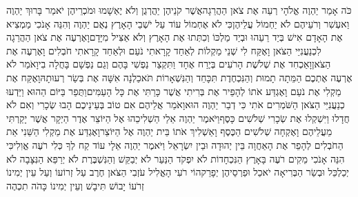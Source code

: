 \documentclass[../main/main.tex]{subfiles}
\begin{document}
\begin{multicols}{\ncols}
כֹּה אָמַר יַהְוֶה אֱלֹהָי רְעֵה אֶת צֹאן הַהֲרֵגָה\PreVerseSpace{}אֲשֶׁר קֹנֵיהֶן יַהֲרְגֻן וְלֹא יֶאְשָׁמוּ וּמֹכְרֵיהֶן יֹאמַר בָּרוּךְ יַהְוֶה וַאעְשִׁר וְרֹעֵיהֶם לֹא יַחְמוֹל עֲלֵיהֶן\PreVerseSpace{}כִּי לֹא אֶחְמוֹל עוֹד עַל יֹשְׁבֵי הָאָרֶץ נְאֻם יַהְוֶה וְהִנֵּה אָנֹכִי מַמְצִיא אֶת הָאָדָם אִישׁ בְּיַד רֵעֵהוּ וּבְיַד מַלְכּוֹ וְכִתְּתוּ אֶת הָאָרֶץ וְלֹא אַצִּיל מִיָּדָם\PreVerseSpace{}וָאֶרְעֶה אֶת צֹאן הַהֲרֵגָה לִכְנַעֲנִיֵּי\SubEnd{} הַצֹּאן וָאֶקַּח לִי שְׁנֵי מַקְלוֹת לְאַחַד קָרָאתִי נֹעַם וּלְאַחַד קָרָאתִי חֹבְלִים וָאֶרְעֶה אֶת הַצֹּאן\PreVerseSpace{}וָאַכְחִד אֶת שְׁלֹשֶׁת הָרֹעִים בְּיֶרַח אֶחָד וַתִּקְצַר נַפְשִׁי בָּהֶם וְגַם נַפְשָׁם בָּחֲלָה בִי\PreVerseSpace{}וָאֹמַר לֹא אֶרְעֶה אֶתְכֶם הַמֵּתָה תָמוּת וְהַנִּכְחֶדֶת תִּכָּחֵד וְהַנִּשְׁאָרוֹת תֹּאכַלְנָה אִשָּׁה אֶת בְּשַׂר רְעוּתָהּ\PreVerseSpace{}וָאֶקַּח אֶת מַקְלִי אֶת נֹעַם וָאֶגְדַּע אֹתוֹ לְהָפֵיר אֶת בְּרִיתִי אֲשֶׁר כָּרַתִּי אֶת כָּל הָעַמִּים\PreVerseSpace{}וַתֻּפַר בַּיּוֹם הַהוּא וַיֵּדְעוּ כְנַעֲנִיֵּי\SubEnd{} הַצֹּאן הַשֹּׁמְרִים אֹתִי כִּי דְבַר יַהְוֶה הוּא\PreVerseSpace{}וָאֹמַר אֲלֵיהֶם אִם טוֹב בְּעֵינֵיכֶם הָבוּ שְׂכָרִי וְאִם לֹא חֲדָלוּ וַיִּשְׁקְלוּ אֶת שְׂכָרִי שְׁלֹשִׁים כָּסֶף\PreVerseSpace{}וַיֹּאמֶר יַהְוֶה אֵלַי הַשְׁלִיכֵהוּ אֶל הַיּוֹצֵר אֶדֶר הַיְקָר אֲשֶׁר יָקַרְתִּי מֵעֲלֵיהֶם וָאֶקְחָה שְׁלֹשִׁים הַכֶּסֶף וָאַשְׁלִיךְ אֹתוֹ בֵּית יַהְוֶה אֶל הַיּוֹצֵר\PreVerseSpace{}וָאֶגְדַּע אֶת מַקְלִי הַשֵּׁנִי אֵת הַחֹבְלִים לְהָפֵר אֶת הָאַחֲוָה בֵּין יְהוּדָה וּבֵין יִשְׂרָאֵל \ClosedSection{}וַיֹּאמֶר יַהְוֶה אֵלָי עוֹד קַח לְךָ כְּלִי רֹעֶה אֱוִלִי\PreVerseSpace{}כִּי הִנֵּה אָנֹכִי מֵקִים רֹעֶה בָּאָרֶץ הַנִּכְחָדוֹת לֹא יִפְקֹד הַנַּעַר לֹא יְבַקֵּשׁ וְהַנִּשְׁבֶּרֶת לֹא יְרַפֵּא הַנִּצָּבָה לֹא יְכַלְכֵּל וּבְשַׂר הַבְּרִיאָה יֹאכַל וּפַרְסֵיהֶן יְפָרֵק\PreVerseSpace{}הוֹי רֹעִי הָאֱלִיל עֹזְבִי הַצֹּאן חֶרֶב עַל זְרוֹעוֹ וְעַל עֵין יְמִינוֹ זְרֹעוֹ יָבוֹשׁ תִּיבָשׁ וְעֵין יְמִינוֹ כָּהֹה תִכְהֶה\OpenSection{}\par
\pagebreak %

\end{multicols}
\end{document}

